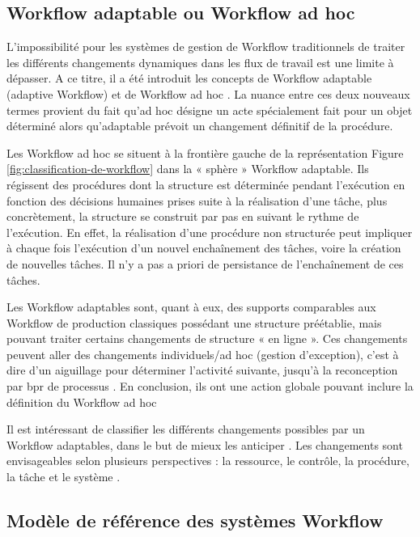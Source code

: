 \subsection{Workflow adaptable ou Workflow ad hoc }
L’impossibilité pour les systèmes de gestion de Workflow traditionnels de traiter les différents changements dynamiques dans les flux de travail est une limite à dépasser. A ce titre, il a été introduit les concepts de Workflow adaptable (adaptive Workflow) \parencite{VanderAalst} et de Workflow ad hoc \parencite{Voorhoeve}. La nuance entre ces deux nouveaux termes provient du fait qu’ad hoc désigne un acte spécialement fait pour un objet déterminé alors qu’adaptable prévoit un changement définitif de la procédure. 

Les Workflow ad hoc se situent à la frontière gauche de la représentation Figure \ref{fig:classification-de-workflow} dans
la « sphère » Workflow adaptable. Ils régissent des procédures dont la structure est déterminée pendant l’exécution en fonction des décisions humaines prises suite à la réalisation d’une
tâche, plus concrètement, la structure se construit par pas en suivant le rythme de l’exécution. En effet, la réalisation d’une procédure non structurée peut impliquer à chaque fois l’exécution d’un nouvel enchaînement des tâches, voire la création de nouvelles tâches. Il n’y a pas a priori de persistance de l’enchaînement de ces tâches.

Les Workflow adaptables sont, quant à eux, des supports comparables aux Workflow de
production classiques possédant une structure préétablie, mais pouvant traiter certains changements de structure « en ligne ». Ces changements peuvent aller des changements individuels/ad hoc (gestion d’exception), c’est à dire d’un aiguillage pour déterminer l’activité suivante, jusqu'à la reconception par \ac{bpr} de processus \parencite{VanderAalst}. En conclusion, ils ont une action globale pouvant inclure la définition du Workflow ad hoc  

Il est intéressant de classifier les différents changements possibles par un Workflow adaptables, dans le but de mieux les anticiper  \parencite{Sadiq}. Les changements sont envisageables
selon plusieurs perspectives : la ressource, le contrôle, la procédure, la tâche et le système \parencite{VanderAalst}.


\subsection{Modèle de référence des systèmes Workflow }

